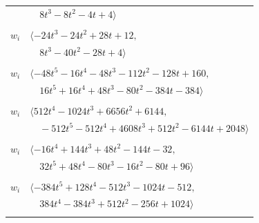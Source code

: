 \documentclass[11pt]{article}
\begin{document}
\begin{longtable}{@{}ll@{}}
 & $\quad 8t^{3}-8t^{2}-4t+4\rangle$\\
\addlinespace[2pt]
\multicolumn{2}{@{}p{0.97\textwidth}@{}}{$i=13$, $D_i=2$, $\rho_{ij}$: $7{:}1, \allowbreak 8{:}2, \allowbreak 23{:}1, \allowbreak 26{:}3, \allowbreak 30{:}3, \allowbreak 43{:}1, \allowbreak 46{:}1$}\\
$w_i$ & $\langle -24t^{3}-24t^{2}+28t+12,$\\
 & $\quad 8t^{3}-40t^{2}-28t+4\rangle$\\
\addlinespace[2pt]
\multicolumn{2}{@{}p{0.97\textwidth}@{}}{$i=14$, $D_i=2$, $e_i=2$, $\rho_{ij}$: $5{:}3, \allowbreak 7{:}3, \allowbreak 18{:}3, \allowbreak 22{:}2, \allowbreak 28{:}1, \allowbreak 30{:}3, \allowbreak 34{:}3, \allowbreak 37{:}1$}\\
$w_i$ & $\langle -48t^{5}-16t^{4}-48t^{3}-112t^{2}-128t+160,$\\
 & $\quad 16t^{5}+16t^{4}+48t^{3}-80t^{2}-384t-384\rangle$\\
\addlinespace[2pt]
\multicolumn{2}{@{}p{0.97\textwidth}@{}}{$i=15$, $D_i=16$, $e_i=2$, $\rho_{ij}$: $7{:}3, \allowbreak 16{:}3, \allowbreak 17{:}3, \allowbreak 21{:}3, \allowbreak 25{:}1, \allowbreak 26{:}1, \allowbreak 30{:}1, \allowbreak 41{:}3, \allowbreak 44{:}1$}\\
$w_i$ & $\langle 512t^{4}-1024t^{3}+6656t^{2}+6144,$\\
 & $\quad -512t^{5}-512t^{4}+4608t^{3}+512t^{2}-6144t+2048\rangle$\\
\addlinespace[2pt]
\multicolumn{2}{@{}p{0.97\textwidth}@{}}{$i=16$, $D_i=1$, $e_i=1$, $\rho_{ij}$: $3{:}2, \allowbreak 6{:}3, \allowbreak 15{:}1, \allowbreak 18{:}1, \allowbreak 22{:}2, \allowbreak 29{:}1, \allowbreak 31{:}3, \allowbreak 43{:}1, \allowbreak 44{:}1, \allowbreak 45{:}3$}\\
$w_i$ & $\langle -16t^{4}+144t^{3}+48t^{2}-144t-32,$\\
 & $\quad 32t^{5}+48t^{4}-80t^{3}-16t^{2}-80t+96\rangle$\\
\addlinespace[2pt]
\multicolumn{2}{@{}p{0.97\textwidth}@{}}{$i=17$, $D_i=2$, $e_i=1$, $\rho_{ij}$: $1{:}1, \allowbreak 6{:}1, \allowbreak 8{:}3, \allowbreak 11{:}3, \allowbreak 15{:}1, \allowbreak 18{:}1, \allowbreak 24{:}1, \allowbreak 39{:}3, \allowbreak 40{:}3, \allowbreak 43{:}3$}\\
$w_i$ & $\langle -384t^{5}+128t^{4}-512t^{3}-1024t-512,$\\
 & $\quad 384t^{4}-384t^{3}+512t^{2}-256t+1024\rangle$\\
\addlinespace[2pt]
\multicolumn{2}{@{}p{0.97\textwidth}@{}}{$i=18$, $D_i=1$, $\rho_{ij}$: $0{:}2, \allowbreak 2{:}2, \allowbreak 11{:}3, \allowbreak 14{:}1, \allowbreak 16{:}3, \allowbreak 17{:}3, \allowbreak 33{:}2, \allowbreak 34{:}1, \allowbreak 36{:}2, \allowbreak 37{:}1, \allowbreak 41{:}1$}\\

\end{longtable}
\end{document}
